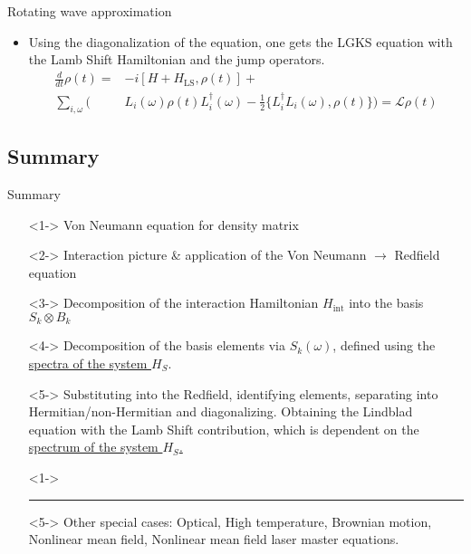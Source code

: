 \documentclass[10pt,xcolor={table,dvipsnames},t]{beamer}
\newcommand{\dt}{\frac{d}{dt}}
\newcommand{\Hint}{H_{\text{int}}}
\begin{document}
\begin{frame}{Rotating wave approximation}
  \begin{itemize}
    \item<1-> Using the diagonalization of the equation, one gets the LGKS equation with the Lamb Shift 
      Hamiltonian and the jump operators.
      \begin{equation}
        \begin{split}
          \dt \rho(t) =& -i[H+H_\text{LS},\rho(t)] + \\
          \sum_{i,\omega}\biggl(
                       &L_i(\omega)\rho(t)L_i^\dag(\omega) - \frac{1}{2}\bigl\{ L_i^\dag L_i(\omega),\rho(t) \bigr\}
          \biggr)
                       =\mathcal{L}\rho(t)
        \end{split}
      \end{equation}
  \end{itemize}
\end{frame}
\subsection{Summary}


\begin{frame}{Summary}
  \begin{itemize}
    \item[\rightarrow]<1-> Von Neumann equation for density matrix
    \item[\rightarrow]<2-> Interaction picture \& application of the Von Neumann $\rightarrow$ Redfield equation
    \item[\rightarrow]<3-> Decomposition of the interaction Hamiltonian $\Hint$ into the basis $S_k\otimes B_k$
    \item[\rightarrow]<4-> Decomposition of the basis elements via $S_k(\omega)$, defined using the \underline{spectra of the system $H_S$}.
    \item[\rightarrow]<5-> Substituting into the Redfield, identifying elements, separating into Hermitian/non-Hermitian and diagonalizing. 
      Obtaining the Lindblad equation 
      with the Lamb Shift contribution, which is dependent on the \underline{spectrum of the system $H_S$.} 
    \item[]<1->\vspace{0.2cm}
      \hrule 
    \item[]<5-> Other special cases: Optical, High temperature, Brownian motion, Nonlinear mean field, Nonlinear mean field laser master 
        equations.
  \end{itemize}
\end{frame}
\end{document}
